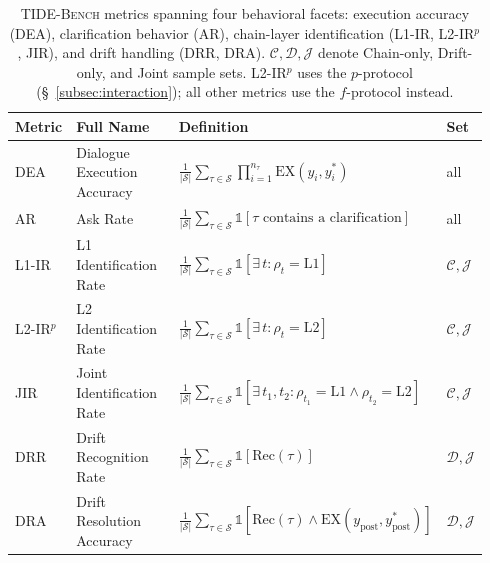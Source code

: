 \begin{table}[t]
\centering
\normalsize
\setlength{\tabcolsep}{3pt}
\renewcommand{\arraystretch}{1.35}

\begin{tabularx}{\linewidth}{@{}p{0.08\linewidth} p{0.32\linewidth} p{0.47\linewidth} p{0.07\linewidth}@{}}
\toprule
\textbf{Metric}
& \textbf{Full Name}
& \textbf{Definition}
& \textbf{Set} \\
\midrule
DEA & Dialogue Execution Accuracy
& $\frac{1}{|\mathcal{S}|} \sum_{\tau \in \mathcal{S}} \prod_{i=1}^{n_\tau} \mathrm{EX}(y_i, y_i^*)$
& all \\

AR & Ask Rate
& $\frac{1}{|\mathcal{S}|} \sum_{\tau \in \mathcal{S}} \mathds{1}\!\left[\tau \text{ contains a clarification}\right]$
& all \\

L1-IR & L1 Identification Rate
& $\frac{1}{|\mathcal{S}|} \sum_{\tau \in \mathcal{S}} \mathds{1}\!\left[\exists\, t : \rho_t = \mathrm{L1}\right]$
& $\mathcal{C}, \mathcal{J}$ \\

L2-IR$^{p}$ & L2 Identification Rate
& $\frac{1}{|\mathcal{S}|} \sum_{\tau \in \mathcal{S}} \mathds{1}\!\left[\exists\, t : \rho_t = \mathrm{L2}\right]$
& $\mathcal{C}, \mathcal{J}$ \\

JIR & Joint Identification Rate
& $\frac{1}{|\mathcal{S}|} \sum_{\tau \in \mathcal{S}} \mathds{1}\!\left[\exists\, t_1, t_2 : \rho_{t_1} = \mathrm{L1} \wedge \rho_{t_2} = \mathrm{L2}\right]$
& $\mathcal{C}, \mathcal{J}$ \\

DRR & Drift Recognition Rate
& $\frac{1}{|\mathcal{S}|} \sum_{\tau \in \mathcal{S}} \mathds{1}\!\left[\mathrm{Rec}(\tau)\right]$
& $\mathcal{D}, \mathcal{J}$ \\

DRA & Drift Resolution Accuracy
& $\frac{1}{|\mathcal{S}|} \sum_{\tau \in \mathcal{S}} \mathds{1}\!\left[\mathrm{Rec}(\tau) \wedge \mathrm{EX}(y_{\mathrm{post}}, y_{\mathrm{post}}^*)\right]$
& $\mathcal{D}, \mathcal{J}$ \\
\bottomrule
\end{tabularx}
\vspace{-1mm}
\caption{\textsc{TIDE-Bench} metrics spanning four behavioral facets: execution accuracy (DEA), clarification behavior (AR), chain-layer identification (L1-IR, L2-IR$^{p}$, JIR), and drift handling (DRR, DRA). $\mathcal{C}, \mathcal{D}, \mathcal{J}$ denote Chain-only, Drift-only, and Joint sample sets. L2-IR$^{p}$ uses the $p$-protocol (\S~\ref{subsec:interaction}); all other metrics use the $f$-protocol instead.}
\label{tab:metrics}
\vspace{-4mm}
\end{table}